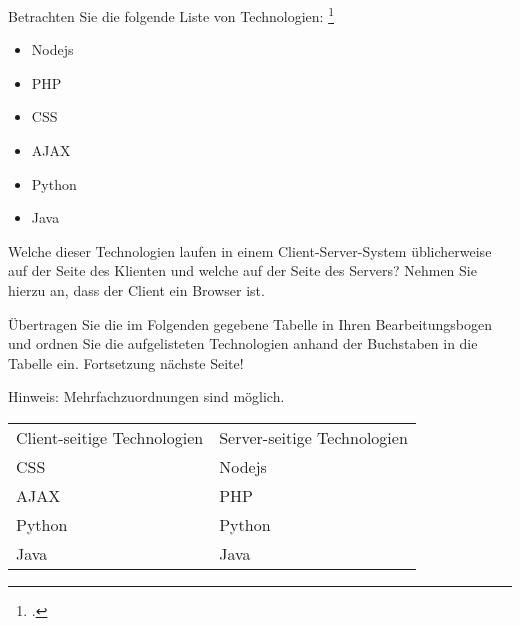 \documentclass{bschlangaul-aufgabe}
\begin{document}

Betrachten Sie die folgende Liste von Technologien:
\footcite{examen:66116:2021:03}

\begin{itemize}
\item Nodejs

\item PHP

\item CSS

\item AJAX

\item Python

\item Java
\end{itemize}

Welche dieser Technologien laufen in einem Client-Server-System
üblicherweise auf der Seite des Klienten und welche auf der Seite des
Servers? Nehmen Sie hierzu an, dass der Client ein Browser ist.

Übertragen Sie die im Folgenden gegebene Tabelle in Ihren
Bearbeitungsbogen und ordnen Sie die aufgelisteten Technologien anhand
der Buchstaben in die Tabelle ein. Fortsetzung nächste Seite!

Hinweis: Mehrfachzuordnungen sind möglich.

\begin{bAntwort}
\begin{tabular}{ll}
Client-seitige Technologien & Server-seitige Technologien \\
CSS & Nodejs \\
AJAX & PHP \\
Python & Python \\
Java & Java \\
\end{tabular}
\end{bAntwort}
\end{document}
